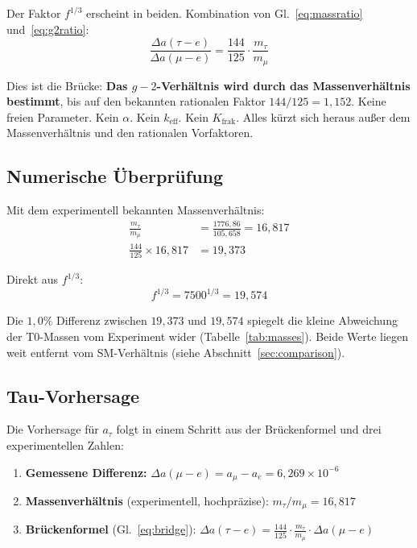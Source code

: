 Der Faktor $f^{1/3}$ erscheint in beiden. Kombination von Gl.~\ref{eq:massratio} und~\ref{eq:g2ratio}:
\begin{equation}
	\boxed{\frac{\Delta a(\tau{-}e)}{\Delta a(\mu{-}e)} = \frac{144}{125} \cdot \frac{m_\tau}{m_\mu}}
	\label{eq:bridge}
\end{equation}

Dies ist die Brücke: \textbf{Das $g-2$-Verhältnis wird durch das Massenverhältnis bestimmt}, bis auf den bekannten rationalen Faktor $144/125 = 1{,}152$. Keine freien Parameter. Kein $\alpha$. Kein $k_\text{eff}$. Kein $K_\text{frak}$. Alles kürzt sich heraus außer dem Massenverhältnis und den rationalen Vorfaktoren.

\subsection{Numerische Überprüfung}

Mit dem experimentell bekannten Massenverhältnis:
\begin{align}
	\frac{m_\tau}{m_\mu} &= \frac{1776{,}86}{105{,}658} = 16{,}817 \\
	\frac{144}{125} \times 16{,}817 &= 19{,}373
\end{align}

Direkt aus $f^{1/3}$:
\begin{equation}
	f^{1/3} = 7500^{1/3} = 19{,}574
\end{equation}

Die $1{,}0\%$ Differenz zwischen $19{,}373$ und $19{,}574$ spiegelt die kleine Abweichung der T0-Massen vom Experiment wider (Tabelle~\ref{tab:masses}). Beide Werte liegen weit entfernt vom SM-Verhältnis (siehe Abschnitt~\ref{sec:comparison}).

\subsection{Tau-Vorhersage}

Die Vorhersage für $a_\tau$ folgt in einem Schritt aus der Brückenformel und drei experimentellen Zahlen:

\begin{enumerate}
	\item \textbf{Gemessene Differenz:} $\Delta a(\mu{-}e) = a_\mu - a_e = 6{,}269 \times 10^{-6}$
	\item \textbf{Massenverhältnis} (experimentell, hochpräzise): $m_\tau/m_\mu = 16{,}817$
	\item \textbf{Brückenformel} (Gl.~\ref{eq:bridge}): $\Delta a(\tau{-}e) = \frac{144}{125} \cdot \frac{m_\tau}{m_\mu} \cdot \Delta a(\mu{-}e)$
\end{enumerate}

